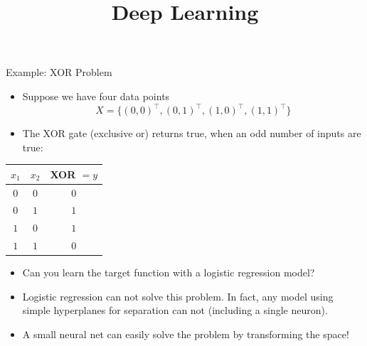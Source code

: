 





\newcommand{\titlefigure}{figure/xor1.png}
\newcommand{\learninggoals}{
  \item Example problem a single neuron can not solve but a single hidden layer net can
}

\title{Deep Learning}
\date{}





\begin{vbframe}{Example: XOR Problem}
  \begin{itemize}
    \item Suppose we have four data points $$X = \{(0,0)^\top, (0,1)^\top, (1,0)^\top, (1,1)^\top \}$$
    \item The XOR gate (exclusive or) returns true, when an odd number of inputs are true:
  \end{itemize}
  \begin{table}
    \centering
      \begin{tabular}{ccc}
        \textbf{$x_1$}  & \textbf{$x_2$}  & \textbf{XOR} $= y$ \\
        \hline
        \hline
        $0$             &   $0$           &  $0$ \\
        $0$             &   $1$           &  $1$ \\
        $1$             &   $0$           &  $1$ \\
        $1$             &   $1$           &  $0$
      \end{tabular}
  \end{table}
  \begin{itemize}
    \item Can you learn the target function with a logistic regression model? \\
  \end{itemize}
\framebreak
  \begin{minipage}{0.45\textwidth}
    \begin{itemize}
      \item Logistic regression can not solve this problem. %
      In fact, any model using simple hyperplanes for separation can not (including a single neuron).
      \lz
      \item A small neural net can easily solve the problem by transforming the space!

\end{itemize}
\end{minipage}
\end{vbframe}
